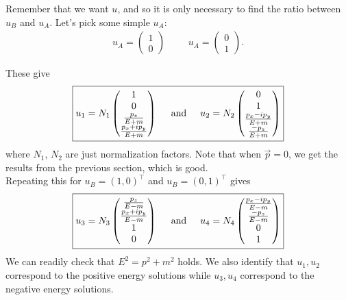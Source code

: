 \documentclass{book}
\theoremstyle{definition}
\newcommand{\f}[2]{\frac{#1}{#2}}
\begin{document}
Remember that we want $u$, and so it is only necessary to find the ratio between $u_B$ and $u_A$. Let's pick some simple $u_A$:
\begin{align}
u_A = \begin{pmatrix}
1\\0
\end{pmatrix}\hspace{1cm} u_A = \begin{pmatrix}
0 \\1
\end{pmatrix}.
\end{align}

These give
\begin{align}
\boxed{u_1 = N_1 \begin{pmatrix}
1 \\ 0 \\ \f{p_z}{E+m} \\ \f{p_x + ip_y}{E+m}
\end{pmatrix}
\hspace{0.5cm}
\text{and}
\hspace{0.5cm}
u_2 = N_2 \begin{pmatrix}
0 \\ 1\\ \f{p_x - ip_y}{E+m} \\ \f{-p_z}{E+m}
\end{pmatrix}}
\end{align}
where $N_1$, $N_2$ are just normalization factors. Note that when $\vec{p} = 0$, we get the results from the previous section, which is good. \\

Repeating this for $u_B = (1,0)^\top$ and $u_B = (0,1)^\top$ gives
\begin{align}
\boxed{
u_3 = N_3 \begin{pmatrix}
\f{p_z}{E-m} \\ \f{p_x + ip_y}{E-m} \\ 1\\ 0
\end{pmatrix}
\hspace{0.5cm}
\text{and}
\hspace{0.5cm}
u_4 = N_4\begin{pmatrix}
\f{p_x - ip_y}{E-m} \\ \f{-p_z}{E-m} \\ 0 \\1
\end{pmatrix}
}
\end{align}
We can readily check that $\boxed{E^2 = p^2 + m^2}$ holds. We also identify that $u_1, u_2$ correspond to the positive energy solutions while $u_3, u_4$ correspond to the negative energy solutions. \\
\end{document}
